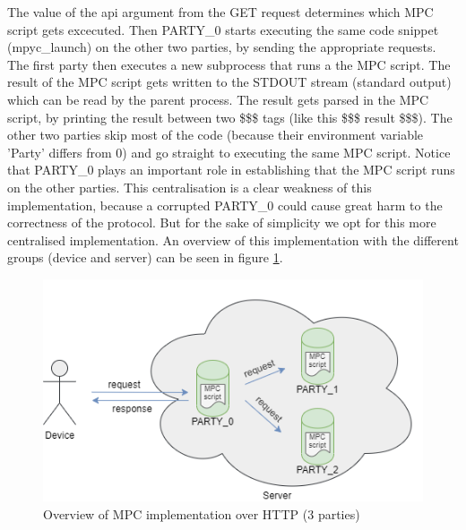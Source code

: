 The value of the api argument from the GET request determines which MPC script gets excecuted. Then PARTY\_0 starts executing the same code snippet (mpyc\_launch) on the other two parties, by sending the appropriate requests. The first party then executes a new subprocess that runs a the MPC script. The result of the MPC script gets written to the STDOUT stream (standard output) which can be read by the parent process. The result gets parsed in the MPC script, by printing the result between two \$\$\$ tags (like this \$\$\$ result \$\$\$). The other two parties skip most of the code (because their environment variable 'Party' differs from 0) and go straight to executing the same MPC script. Notice that PARTY\_0 plays an important role in establishing that the MPC script runs on the other parties. This centralisation is a clear weakness of this implementation, because a corrupted PARTY\_0 could cause great harm to the correctness of the protocol. But for the sake of simplicity we opt for this more centralised implementation. An overview of this implementation with the different groups (device and server) can be seen in figure \ref{fig:implementationoverview}.

\begin{figure}[H]
  \includegraphics[scale=0.75]{fig/implementationoverview.png}
  \centering
  \caption{Overview of MPC implementation over HTTP (3 parties)}
  \label{fig:implementationoverview}
\end{figure}

